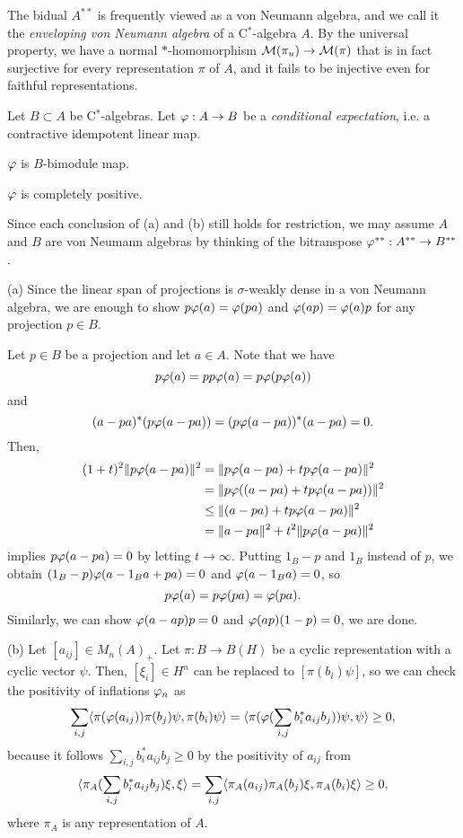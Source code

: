 \documentclass{../../../small}
\begin{document}
\begin{rmk}
The bidual $A^{**}$ is frequently viewed as a von Neumann algebra, and we call it the \emph{enveloping von Neumann algebra} of a C$^*$-algebra $A$.
By the universal property, we have a normal $*$-homomorphism $\mathcal{M}(\pi_u)\to\mathcal{M}(\pi)$ that is in fact surjective for every representation $\pi$ of $A$, and it fails to be injective even for faithful representations.
\end{rmk}

\begin{thm}[Tomiyama]
Let $B\subset A$ be C$^*$-algebras.
Let $\varphi:A\to B$ be a \emph{conditional expectation}, i.e. a contractive idempotent linear map.
\begin{parts}
\item $\varphi$ is $B$-bimodule map.
\item $\varphi$ is completely positive.
\end{parts}
\end{thm}
\begin{pf}
Since each conclusion of (a) and (b) still holds for restriction, we may assume $A$ and $B$ are von Neumann algebras by thinking of the bitranspose $\varphi^{**}:A^{**}\to B^{**}$.

(a)
Since the linear span of projections is $\sigma$-weakly dense in a von Neumann algebra, we are enough to show $p\varphi(a)=\varphi(pa)$ and $\varphi(ap)=\varphi(a)p$ for any projection $p\in B$.

Let $p\in B$ be a projection and let $a\in A$.
Note that we have
\[p\varphi(a)=pp\varphi(a)=p\varphi(p\varphi(a))\]
and
\[(a-pa)^*(p\varphi(a-pa))=(p\varphi(a-pa))^*(a-pa)=0.\]
Then,
\begin{align*}
(1+t)^2\|p\varphi(a-pa)\|^2
&=\|p\varphi(a-pa)+tp\varphi(a-pa)\|^2\\
&=\|p\varphi((a-pa)+tp\varphi(a-pa))\|^2\\
&\le\|(a-pa)+tp\varphi(a-pa)\|^2\\
&=\|a-pa\|^2+t^2\|p\varphi(a-pa)\|^2
\end{align*}
implies $p\varphi(a-pa)=0$ by letting $t\to\infty$.
Putting $1_ B-p$ and $1_ B$ instead of $p$, we obtain $(1_ B-p)\varphi(a-1_ B a+pa)=0$ and $\varphi(a-1_ B a)=0$, so
\[p\varphi(a)=p\varphi(pa)=\varphi(pa).\]
Similarly, we can show $\varphi(a-ap)p=0$ and $\varphi(ap)(1-p)=0$, we are done.

(b)
Let $[a_{ij}]\in M_n(A)_+$.
Let $\pi: B\to B(H)$ be a cyclic representation with a cyclic vector $\psi$.
Then, $[\xi_i]\in H^n$ can be replaced to $[\pi(b_i)\psi]$, so we can check the positivity of inflations $\varphi_n$ as
\[\sum_{i,j}\langle\pi(\varphi(a_{ij}))\pi(b_j)\psi,\pi(b_i)\psi\rangle=\langle\pi(\varphi(\sum_{i,j}b_i^*a_{ij}b_j))\psi,\psi\rangle\ge0,\]
because it follows $\sum_{i,j}b_i^*a_{ij}b_j\ge0$ by the positivity of $a_{ij}$ from
\[\langle\pi_ A(\sum_{i,j}b_i^*a_{ij}b_j)\xi,\xi\rangle=\sum_{i,j}\langle\pi_ A(a_{ij})\pi_ A(b_j)\xi,\pi_ A(b_i)\xi\rangle\ge0,\]
where $\pi_ A$ is any representation of $A$.
\end{pf}
\end{document}
